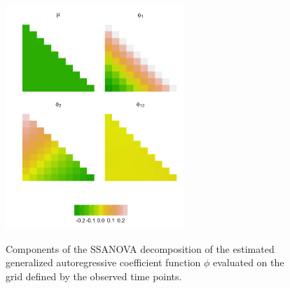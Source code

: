 


\begin{figure}[H] 
\centering
\caption{Components of the SSANOVA decomposition of the estimated generalized autoregressive coefficient function $\phi$ evaluated on the grid defined by the observed time points.}
  \includegraphics[width = 0.6\textwidth]{../img/chapter-5/cattle-ssanova-estimate-lattice} \label{fig:cattle-fitted-cholesky-ssanova}
\end{figure}
